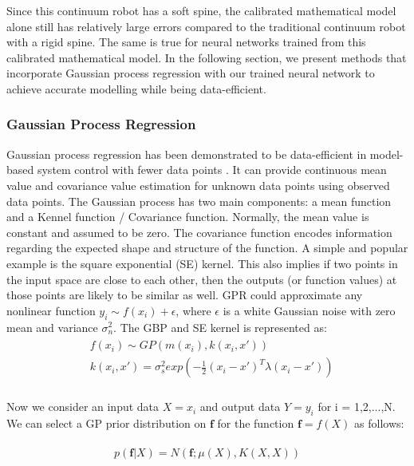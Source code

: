 Since this continuum robot has a soft spine, the calibrated mathematical model alone still has relatively large errors compared to the traditional continuum robot with a rigid spine. The same is true for neural networks trained from this calibrated mathematical model. In the following section, we present methods that incorporate Gaussian process regression with our trained neural network  to achieve accurate modelling while being data-efficient. 

\subsubsection{Gaussian Process Regression}
Gaussian process regression has been demonstrated to be data-efficient in model-based system control with fewer data points \cite{deisenroth2011pilco}. It can provide continuous mean value and covariance value estimation for unknown data points using  observed data points. The Gaussian process has two main components: a mean function  and a Kennel function / Covariance function. Normally, the mean value is constant and assumed to be zero. The covariance function encodes information regarding the expected shape and structure of the function. A simple and popular example is the square exponential (SE) kernel. This also implies if two points in the input space are close to each other, then the outputs (or function values) at those points are likely to be similar as well. GPR could approximate any nonlinear function $y_i\sim f(x_i) + \epsilon$, where $\epsilon$ is a white Gaussian noise with zero mean and variance $\sigma^2_n$. The GBP and SE kernel is represented as:
\begin{align}
    \begin{split}
        &f(x_i) \sim GP(m(x_i), k(x_i,x'))\\
        &k(x_i,x') = \sigma^2_sexp(-\frac{1}{2}(x_i-x')^T\lambda(x_i-x'))\\
    \end{split}
    \label{eq:X9}
\end{align}

Now we consider an input data $X={x_i}$ and output data $Y={y_i}$ for i = 1,2,...,N. We can select a GP prior distribution on $\mathbf{f}$ for the function $\mathbf{f}=f(X)$ as follows:

\begin{align}
    \begin{split}
        p(\mathbf{f} | X) = N (\mathbf{f}; \mu(X), K(X, X))
    \end{split}
    \label{eq:X10}
\end{align}

